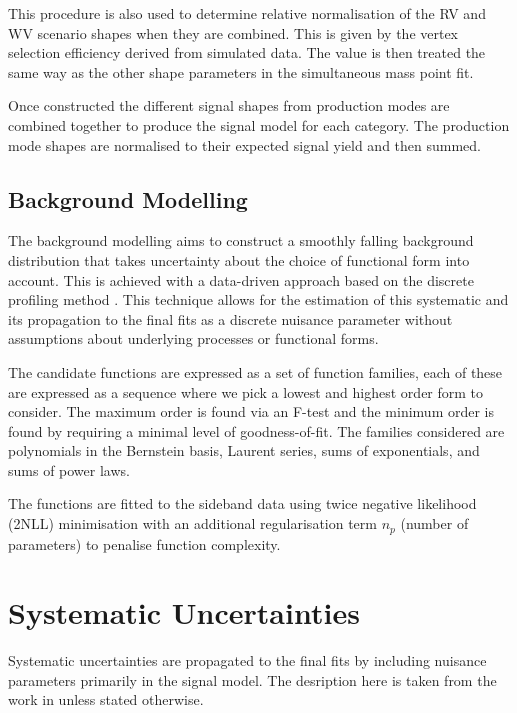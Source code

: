 This procedure is also used to determine relative normalisation of the RV and WV scenario shapes when they are combined. 
This is given by the vertex selection efficiency derived from simulated data. 
The value is then treated the same way as the other shape parameters in the simultaneous mass point fit. 

Once constructed the different signal shapes from production modes are combined together to produce the signal model for each category. 
The production mode shapes are normalised to their expected signal yield and then summed.



\subsection{Background Modelling}
The background modelling aims to construct a smoothly falling background distribution that takes uncertainty about the choice of functional form into account. This is achieved with a data-driven approach based on the discrete profiling method \cite{env_method}. This technique allows for the estimation of this systematic and its propagation to the final fits as a discrete nuisance parameter without assumptions about underlying processes or functional forms. 

The candidate functions are expressed as a set of function families, each of these are expressed as a sequence where we pick a lowest and highest order form to consider. The maximum order is found via an F-test and the minimum order is found by requiring a minimal level of goodness-of-fit. 
The families considered are polynomials in the Bernstein basis, Laurent series, sums of exponentials, and sums of power laws. 

The functions are fitted to the \mgg sideband data using twice negative likelihood (2NLL) minimisation with an additional regularisation term $n_p$ (number of parameters) to penalise function complexity. 



\section{Systematic Uncertainties}
Systematic uncertainties are propagated to the final fits by including nuisance parameters primarily in the signal model. 
The desription here is taken from the work in \cite{HIG-16-040} unless stated otherwise. 

